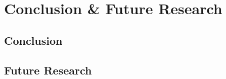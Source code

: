 \chapter{Conclusion \& Future Research}\label{chap:Conclusion}

\section{Conclusion}\label{sec:conclusion}


\section{Future Research}\label{sec:future}
